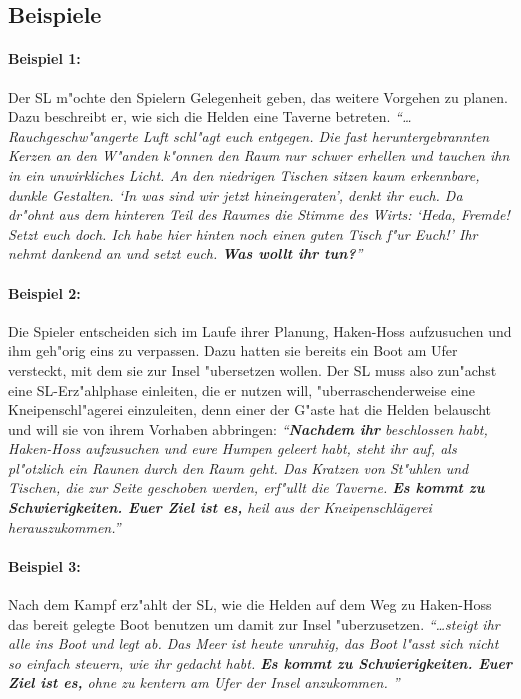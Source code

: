 \subsection{Beispiele}
\begin{beispiel}
\paragraph{Beispiel 1:} Der SL m"ochte den Spielern Gelegenheit geben, das weitere Vorgehen zu planen. Dazu beschreibt er, wie sich die Helden eine Taverne betreten. \emph{``\dots Rauchgeschw"angerte Luft schl"agt euch entgegen. Die fast heruntergebrannten Kerzen an den W"anden k"onnen den Raum nur schwer erhellen und tauchen ihn in ein unwirkliches Licht. An den niedrigen Tischen sitzen kaum erkennbare, dunkle Gestalten. `In was sind wir jetzt hineingeraten', denkt ihr euch. Da dr"ohnt aus dem hinteren Teil des Raumes die Stimme des Wirts: `Heda, Fremde! Setzt euch doch. Ich habe hier hinten noch einen guten Tisch f"ur Euch!' Ihr nehmt dankend an und setzt euch. {\bfseries Was wollt ihr tun?}''}

\paragraph{Beispiel 2:} Die Spieler entscheiden sich im Laufe ihrer Planung, Haken-Hoss aufzusuchen und ihm geh"orig eins zu verpassen. Dazu hatten sie bereits ein Boot am Ufer versteckt, mit dem sie zur Insel "ubersetzen wollen. Der SL muss also zun"achst eine SL-Erz"ahlphase einleiten, die er nutzen will, "uberraschenderweise eine Kneipenschl"agerei einzuleiten, denn einer der G"aste hat die Helden belauscht und will sie von ihrem Vorhaben abbringen: \emph{``{\bfseries Nachdem ihr} beschlossen habt, Haken-Hoss aufzusuchen und eure Humpen geleert habt, steht ihr auf, als pl"otzlich ein Raunen durch den Raum geht. Das Kratzen von St"uhlen und Tischen, die zur Seite geschoben werden, erf"ullt die Taverne. \textbf{Es kommt zu Schwierigkeiten. Euer Ziel ist es,} heil aus der Kneipenschlägerei herauszukommen.''}

\paragraph{Beispiel 3:} Nach dem Kampf erz"ahlt der SL, wie die Helden auf dem Weg zu Haken-Hoss das bereit gelegte Boot benutzen um damit zur Insel "uberzusetzen. \emph{``\dots steigt ihr alle ins Boot und legt ab. Das Meer ist heute unruhig, das Boot l"asst sich nicht so einfach steuern, wie ihr gedacht habt. {\bfseries Es kommt zu Schwierigkeiten. Euer Ziel ist es,} ohne zu kentern am Ufer der Insel anzukommen. ''}
\end{beispiel}

